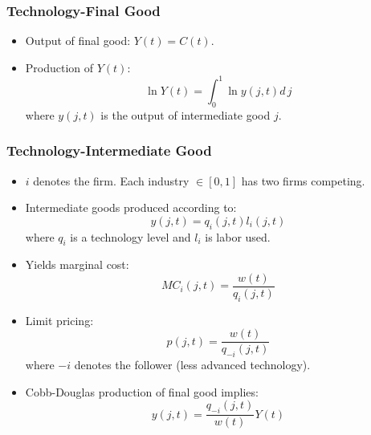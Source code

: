 \documentclass{beamer}
\begin{document}
\begin{frame}[t]\frametitle{Technology-Final Good} 
  \begin{itemize}
    \item Output of final good: $Y(t) = C(t)$.
    
    \item Production of $Y(t)$:
      \begin{equation} \label{eq:tech_output}
        \ln Y(t) = \int_{0}^{1} \ln y(j, t) d\,j 
      \end{equation}
      where $y(j, t)$ is the output of intermediate good $j$.
    
  \end{itemize}
\end{frame}

\begin{frame}[t]\frametitle{Technology-Intermediate Good} 
  \begin{itemize}
    \item $i$ denotes the firm.  Each industry $\in [0, 1]$ has two firms competing.

    \item Intermediate goods produced according to:
      \begin{equation*} \label{eq:intermediate_production}
        y(j, t) = q_i(j, t)l_i(j, t)
      \end{equation*}
      where $q_i$ is a technology level and $l_i$ is labor used. 

    \item Yields marginal cost:
      \begin{equation*} \label{eq:marginal_cost}
        MC_i(j, t) = \frac{w(t)}{q_i(j, t)}
      \end{equation*}

    \item Limit pricing:
      \begin{equation*} \label{eq:limit_pricing}
        p(j, t) = \frac{w(t)}{q_{-i}(j, t)}      
      \end{equation*}
    where $-i$ denotes the follower (less advanced technology).
    \item Cobb-Douglas production of final good implies:
      \begin{equation}
        y(j, t) = \frac{q_{-i}(j, t)}{w(t)}Y(t)
      \end{equation}
  \end{itemize}
\end{frame}
\end{document}

